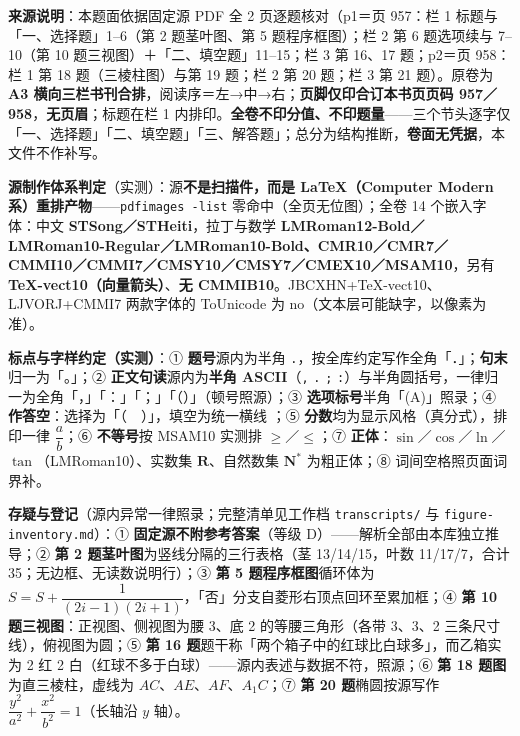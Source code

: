


\begin{gktip}
\setlength{\lineskiplimit}{3pt}\setlength{\lineskip}{4pt}\textbf{来源说明}：本题面依据固定源 PDF 全 2 页逐题核对（p1＝页 957：栏 1 标题与「一、选择题」1–6（第 2 题茎叶图、第 5 题程序框图）；栏 2 第 6 题选项续与 7–10（第 10 题三视图）＋「二、填空题」11–15；栏 3 第 16、17 题；p2＝页 958：栏 1 第 18 题（三棱柱图）与第 19 题；栏 2 第 20 题；栏 3 第 21 题）。原卷为 \textbf{A3 横向三栏书刊合排}，阅读序＝左→中→右；\textbf{页脚仅印合订本书页页码 957／958}，\textbf{无页眉}；标题在栏 1 内排印。\textbf{全卷不印分值、不印题量}——三个节头逐字仅「一、选择题」「二、填空题」「三、解答题」；总分为结构推断，\textbf{卷面无凭据}，本文件不作补写。

\textbf{源制作体系判定}（实测）：源\textbf{不是扫描件，而是 LaTeX（Computer Modern 系）重排产物}——\texttt{pdfimages -list} 零命中（全页无位图）；全卷 14 个嵌入字体：中文 \textbf{STSong／STHeiti}，拉丁与数学 \textbf{LMRoman12-Bold／LMRoman10-Regular／LMRoman10-Bold、CMR10／CMR7／CMMI10／CMMI7／CMSY10／CMSY7／CMEX10／MSAM10}，另有 \textbf{TeX-vect10（向量箭头）}、\textbf{无 CMMIB10}。JBCXHN+TeX-vect10、LJVORJ+CMMI7 两款字体的 ToUnicode 为 no（文本层可能缺字，以像素为准）。

\textbf{标点与字样约定（实测）}：① \textbf{题号}源内为半角 \texttt{.}，按全库约定写作全角「．」；\textbf{句末}归一为「。」；② \textbf{正文句读}源内为\textbf{半角 ASCII}（\texttt{,} \texttt{.} \texttt{;} \texttt{:}）与半角圆括号，一律归一为全角「，」「：」「；」「（）」（顿号照源）；③ \textbf{选项标号}半角「(A)」照录；④ \textbf{作答空}：选择为「（　）」，填空为统一横线 \texttt{\gkblank{}}；⑤ \textbf{分数}均为显示风格（真分式），排印一律 \(\dfrac{a}{b}\)；⑥ \textbf{不等号}按 MSAM10 实测排 \(\geqslant\)／\(\leqslant\)；⑦ \textbf{正体}：\(\sin\)／\(\cos\)／\(\ln\)／\(\tan\)（LMRoman10）、实数集 \(\mathbf{R}\)、自然数集 \(\mathbf{N}^*\) 为粗正体；⑧ 词间空格照页面词界补。

\textbf{存疑与登记}（源内异常一律照录；完整清单见工作档 \texttt{transcripts/} 与 \texttt{figure-inventory.md}）：① \textbf{固定源不附参考答案}（等级 D）——解析全部由本库独立推导；② \textbf{第 2 题茎叶图}为竖线分隔的三行表格（茎 13/14/15，叶数 11/17/7，合计 35；无边框、无读数说明行）；③ \textbf{第 5 题程序框图}循环体为 \(S=S+\dfrac{1}{(2i-1)(2i+1)}\)，「否」分支自菱形右顶点回环至累加框；④ \textbf{第 10 题三视图}：正视图、侧视图为腰 3、底 2 的等腰三角形（各带 3、3、2 三条尺寸线），俯视图为圆；⑤ \textbf{第 16 题}题干称「两个箱子中的红球比白球多」，而乙箱实为 2 红 2 白（红球不多于白球）——源内表述与数据不符，照源；⑥ \textbf{第 18 题图}为直三棱柱，虚线为 \(AC\)、\(AE\)、\(AF\)、\(A_1C\)；⑦ \textbf{第 20 题}椭圆按源写作 \(\dfrac{y^2}{a^2}+\dfrac{x^2}{b^2}=1\)（长轴沿 \(y\) 轴）。
\end{gktip}

